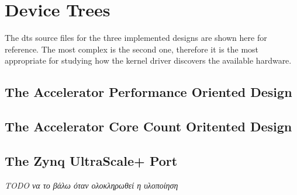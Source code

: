 \chapter{Device Trees}

The \glspl{dt} source files for the three implemented designs are shown here for reference. 
The most complex is the second one, therefore it is the most appropriate
for studying how the kernel driver discovers the available hardware.

\section{The Accelerator Performance Oriented Design}


\section{The Accelerator Core Count Oritented Design}


\section{The Zynq UltraScale+ Port}
\emph{TODO να το βάλω όταν ολοκληρωθεί η υλοποίηση}


